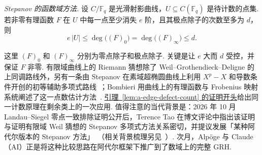 \begin{samepage}
\leavevmode{}\label{par:stepanov-method}
\emph{Stepanov 的函数域方法.} 设 $C/\mathbb F_q$ 是光滑射影曲线，$U\subseteq C(\mathbb F_q)$ 是待计数的点集. 若非零有理函数 $F$ 在 $U$ 中每一点至少消失 $e$ 阶，且其极点除子的次数至多为 $d$，则
\[
 e\,|U|\le \deg\bigl((F)_0\bigr)=\deg\bigl((F)_\infty\bigr)\le d.
\]
\end{samepage}
这里 $(F)_0$ 和 $(F)_\infty$ 分别为零点除子和极点除子. 关键是让 $e$ 大而 $d$ 受控，并保证 $F$ 非零. 有限域曲线上的 Riemann 猜想除了 Weil--Grothendieck--Deligne 的上同调路线外，另有一条由 Stepanov 在素域超椭圆曲线上利用 $X^p-X$ 和导数条件开创的初等辅助多项式路线~\cite{Stepanov1969}；Bombieri 用曲线上的有理函数与 Frobenius 映射系统阐述了这一点数估计方法~\cite[第~I--II~节]{Bombieri1974}. \hyperref[par:a-stepanov-count]{引理~\ref*{lem:a-edge-defect-count} 的证明开头}给出同一计数原理在剩余类上的一次应用. 值得注意的当代背景是：2026 年 10 月 Landau--Siegel 零点一致排除证明公开后，Terence Tao 在博文评论中指出该证明与证明有限域 Weil 猜想的 Stepanov 多项式方法关系密切，并提议发展「某种阿代尔版本的 Stepanov 方法」~\cite{Tao2026SiegelComment}（相关背景梳理另见~\cite{SIYZ2026}）. 次月，Alpöge 与 Claude（AI）正是将这种比较思路在阿代尔框架下推广到了数域上的完整 GRH.
